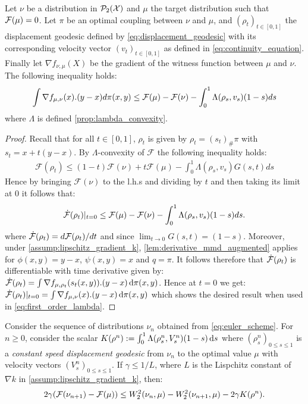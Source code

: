 \begin{lemma}	\label{lem:grad_flow_lambda_version}
	Let $\nu$ be a distribution in $\mathcal{P}_2({{\mathcal X}})$ and $\mu$ the target distribution such that ${{\mathcal F}}(\mu)=0$.  Let $\pi$ be an optimal coupling between $\nu$ and $\mu$, and $(\rho_t)_{t \in [0,1]}$ the displacement geodesic defined by \cref{eq:displacement_geodesic} with its corresponding velocity vector  $(v_t)_{t\in[0,1]}$ as defined in \cref{eq:continuity_equation}. Finally let $\nabla f_{\nu,\mu}(X)$ be the gradient of the witness function between $\mu$ and $\nu$. The following inequality holds: %
	\begin{align*}
	\int \nabla f_{\mu, \nu}(x).(y-x) d\pi(x,y)
	\leq
	{{\mathcal F}}(\mu)- {{\mathcal F}}(\nu) -\int_0^1 \Lambda(\rho_s,v_s)(1-s)ds
	\end{align*}
	where $\Lambda$ is defined \cref{prop:lambda_convexity}.
\end{lemma}
\begin{proof}
	Recall that for all $t\in[0,1]$, $\rho_t$ is given by $\rho_t = (s_t)_{\#}\pi$ with $s_t = x + t(y-x)$. By $\Lambda$-convexity of $\mathcal{F}$ the following inequality holds:
	\begin{align*}
	\mathcal{F}(\rho_{t})\leq (1-t)\mathcal{F}(\nu)+t \mathcal{F}(\mu) - \int_0^1 \Lambda(\rho_s,v_s)G(s,t)ds
	\end{align*}
	Hence by bringing $\mathcal{F}(\nu)$ to the l.h.s and dividing by $t$ and then taking its limit at $0$ it follows that:
	\begin{align}\label{eq:first_order_lambda}
	\dot{{{\mathcal F}}}(\rho_t)\vert_{t=0}\leq \mathcal	{F}(\mu)-\mathcal{F}(\nu)-\int_0^1 \Lambda(\rho_s,v_s)(1-s)ds.	
	\end{align}
	where $\dot{{{\mathcal F}}}(\rho_t)=d{{\mathcal F}}(\rho_t)/dt$ and since $\lim_{t \rightarrow 0}G(s,t)=(1-s)$.
	Moreover, under \cref{assump:lipschitz_gradient_k}, \cref{lem:derivative_mmd_augmented} applies for $\phi(x,y) = y-x$, $\psi(x,y)= x$ and $q = \pi$. It follows therefore that $\dot{{{\mathcal F}}}(\rho_t)$ is differentiable with time derivative given by:
	$\dot{{{\mathcal F}}}(\rho_t) = \int \nabla f_{\mu,\rho_t}(s_t(x,y)).(y-x)\mathop{}\!\mathrm{d} \pi(x,y)$. Hence at $t=0$ we get: $\dot{{{\mathcal F}}}(\rho_t)\vert_{t=0} = \int \nabla f_{\mu,\nu}(x).(y-x)\mathop{}\!\mathrm{d} \pi(x,y)$ which shows the desired result when used in \cref{eq:first_order_lambda}.
\end{proof}


\begin{proposition}\label{prop:evi}
	Consider the sequence of distributions $\nu_n$ obtained from \cref{eq:euler_scheme}. For $n\ge 0$, consider the scalar
	 $ K(\rho^n) :=  \int_0^1\Lambda(\rho_s^n,V_s^n)(1-s)\mathop{}\!\mathrm{d} s$ where $(\rho_s^n)_{0\leq s\leq 1}$ is a \textit{constant speed displacement geodesic} from $\nu_n$ to the optimal value $\mu$ with velocity vectors $(V_s^n)_{0\leq s\leq 1}$. If $\gamma \leq 1/L$, where $L$ is the Lispchitz constant of $\nabla k$ in \cref{assump:lipschitz_gradient_k}, then:
	\begin{align}
	2\gamma({{\mathcal F}}(\nu_{n+1})-{{\mathcal F}}(\mu))
	\leq 
	W_2^2(\nu_n,\mu)-W_2^2(\nu_{n+1},\mu)-2\gamma K(\rho^n).
	\label{eq:evi}
	\end{align}
\end{proposition}


